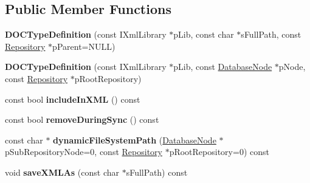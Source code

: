 \subsection*{\-Public \-Member \-Functions}
\begin{DoxyCompactItemize}
\item 
\hypertarget{classgeneral__server_1_1DOCTypeDefinition_a96c099d5882da328b185ca40ca16706a}{{\bfseries \-D\-O\-C\-Type\-Definition} (const \-I\-Xml\-Library $\ast$p\-Lib, const char $\ast$s\-Full\-Path, const \hyperlink{classgeneral__server_1_1Repository}{\-Repository} $\ast$p\-Parent=\-N\-U\-L\-L)}\label{classgeneral__server_1_1DOCTypeDefinition_a96c099d5882da328b185ca40ca16706a}

\item 
\hypertarget{classgeneral__server_1_1DOCTypeDefinition_af7968add1dd91f0a71d83952ef9da3af}{{\bfseries \-D\-O\-C\-Type\-Definition} (const \-I\-Xml\-Library $\ast$p\-Lib, const \hyperlink{classgeneral__server_1_1DatabaseNode}{\-Database\-Node} $\ast$p\-Node, const \hyperlink{classgeneral__server_1_1Repository}{\-Repository} $\ast$p\-Root\-Repository)}\label{classgeneral__server_1_1DOCTypeDefinition_af7968add1dd91f0a71d83952ef9da3af}

\item 
\hypertarget{classgeneral__server_1_1DOCTypeDefinition_a08addbd633a7d7c795846d4eccd874e8}{const bool {\bfseries include\-In\-X\-M\-L} () const }\label{classgeneral__server_1_1DOCTypeDefinition_a08addbd633a7d7c795846d4eccd874e8}

\item 
\hypertarget{classgeneral__server_1_1DOCTypeDefinition_a3d0f255407dc3eaa3f4d003d52f1b97e}{const bool {\bfseries remove\-During\-Sync} () const }\label{classgeneral__server_1_1DOCTypeDefinition_a3d0f255407dc3eaa3f4d003d52f1b97e}

\item 
\hypertarget{classgeneral__server_1_1DOCTypeDefinition_a304faaeb1299c00f9b3a93805aaa024e}{const char $\ast$ {\bfseries dynamic\-File\-System\-Path} (\hyperlink{classgeneral__server_1_1DatabaseNode}{\-Database\-Node} $\ast$p\-Sub\-Repository\-Node=0, const \hyperlink{classgeneral__server_1_1Repository}{\-Repository} $\ast$p\-Root\-Repository=0) const }\label{classgeneral__server_1_1DOCTypeDefinition_a304faaeb1299c00f9b3a93805aaa024e}

\item 
\hypertarget{classgeneral__server_1_1DOCTypeDefinition_a1970e633a1d8555823bf426bb45d2c01}{void {\bfseries save\-X\-M\-L\-As} (const char $\ast$s\-Full\-Path) const }\label{classgeneral__server_1_1DOCTypeDefinition_a1970e633a1d8555823bf426bb45d2c01}


\end{DoxyCompactItemize}
